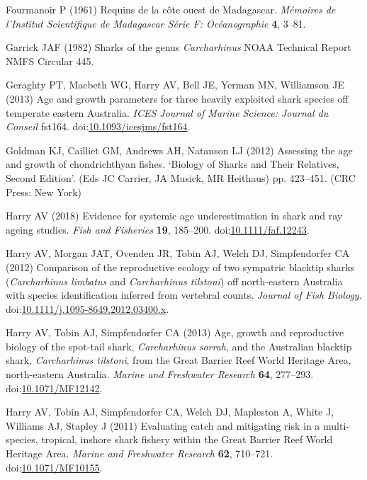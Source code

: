 \documentclass[]{article}
\begin{document}
\leavevmode\hypertarget{ref-fourmanoir_requins_1961}{}%
Fourmanoir P (1961) Requins de la côte ouest de Madagascar.
\emph{Mémoires de l'Institut Scientifique de Madagascar Série F:
Océanographie} \textbf{4}, 3--81.

\leavevmode\hypertarget{ref-garrick_sharks_1982}{}%
Garrick JAF (1982) Sharks of the genus \emph{Carcharhinus} NOAA
Technical Report NMFS Circular 445.

\leavevmode\hypertarget{ref-geraghty_age_2013}{}%
Geraghty PT, Macbeth WG, Harry AV, Bell JE, Yerman MN, Williamson JE
(2013) Age and growth parameters for three heavily exploited shark
species off temperate eastern Australia. \emph{ICES Journal of Marine
Science: Journal du Conseil} fst164.
doi:\href{https://doi.org/10.1093/icesjms/fst164}{10.1093/icesjms/fst164}.

\leavevmode\hypertarget{ref-goldman_assessing_2012}{}%
Goldman KJ, Cailliet GM, Andrews AH, Natanson LJ (2012) Assessing the
age and growth of chondrichthyan fishes. `Biology of Sharks and Their
Relatives, Second Edition'. (Eds JC Carrier, JA Musick, MR Heithaus) pp.
423--451. (CRC Press: New York)

\leavevmode\hypertarget{ref-harry_evidence_2018}{}%
Harry AV (2018) Evidence for systemic age underestimation in shark and
ray ageing studies. \emph{Fish and Fisheries} \textbf{19}, 185--200.
doi:\href{https://doi.org/10.1111/faf.12243}{10.1111/faf.12243}.

\leavevmode\hypertarget{ref-harry_comparison_2012}{}%
Harry AV, Morgan JAT, Ovenden JR, Tobin AJ, Welch DJ, Simpfendorfer CA
(2012) Comparison of the reproductive ecology of two sympatric blacktip
sharks (\emph{Carcharhinus limbatus} and \emph{Carcharhinus tilstoni})
off north-eastern Australia with species identification inferred from
vertebral counts. \emph{Journal of Fish Biology}.
doi:\href{https://doi.org/10.1111/j.1095-8649.2012.03400.x}{10.1111/j.1095-8649.2012.03400.x}.

\leavevmode\hypertarget{ref-harry_age_2013}{}%
Harry AV, Tobin AJ, Simpfendorfer CA (2013) Age, growth and reproductive
biology of the spot-tail shark, \emph{Carcharhinus sorrah}, and the
Australian blacktip shark, \emph{Carcharhinus tilstoni}, from the Great
Barrier Reef World Heritage Area, north-eastern Australia. \emph{Marine
and Freshwater Research} \textbf{64}, 277--293.
doi:\href{https://doi.org/10.1071/MF12142}{10.1071/MF12142}.

\leavevmode\hypertarget{ref-harry_evaluating_2011}{}%
Harry AV, Tobin AJ, Simpfendorfer CA, Welch DJ, Mapleston A, White J,
Williams AJ, Stapley J (2011) Evaluating catch and mitigating risk in a
multi-species, tropical, inshore shark fishery within the Great Barrier
Reef World Heritage Area. \emph{Marine and Freshwater Research}
\textbf{62}, 710--721.
doi:\href{https://doi.org/10.1071/MF10155}{10.1071/MF10155}.
\end{document}
